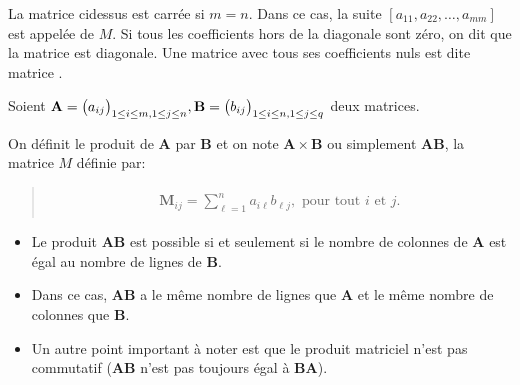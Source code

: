 \documentclass[letterpaper,11pt,english]{sphinxmanual}
\begin{document}
\begin{DUlineblock}{0em}
\item[] La matrice ci\sphinxhyphen{}dessus est carrée si \(m=n\). Dans ce cas, la suite
\([a_{11}, a_{22}, \dots, a_{mm}]\) est appelée  de
\(M\). Si tous les coefficients hors de la diagonale sont zéro, on
dit que la matrice est diagonale. Une matrice avec tous ses
coefficients nuls est dite matrice .
\item[]  Soient
\(\mathbf{A}=\big{(}a_{ij}\big{)}_{1\le i\le m, 1\le j\le n}, \mathbf{B}=\big{(}b_{ij}\big{)}_{1\le i\le n, 1\le j\le q}\)
deux matrices.
\item[] On définit le produit de \(\mathbf{A}\) par \(\mathbf{B}\) et
on note \(\mathbf{A}\times \mathbf{B}\) ou simplement
\(\mathbf{A}\mathbf{B}\), la matrice \(M\) définie par:
\end{DUlineblock}
\begin{quote}
\begin{equation}\label{equation:chapter2:chapter2:3}
\begin{split}\begin{aligned}
    \mathbf{M}_{ij} = \sum_{\ell=1}^{n}a_{i\ell}b_{\ell j}, \text{ pour tout } i \text{ et } j.\end{aligned}\end{split}
\end{equation}
\sphinxAtStartPar
{}
\end{quote}
\begin{itemize}
\item {} 
\sphinxAtStartPar
Le produit \(\mathbf{AB}\) est possible si et seulement si le
nombre de colonnes de \(\mathbf{A}\) est égal au nombre de lignes
de \(\mathbf{B}\).

\item {} 
\sphinxAtStartPar
Dans ce cas, \(\mathbf{AB}\) a le même nombre de lignes que
\(\mathbf{A}\) et le même nombre de colonnes que
\(\mathbf{B}\).

\item {} 
\sphinxAtStartPar
Un autre point important à noter est que le produit matriciel n’est
pas commutatif (\(\mathbf{AB}\) n’est pas toujours égal à
\(\mathbf{BA}\)).

\end{itemize}
\end{document}
